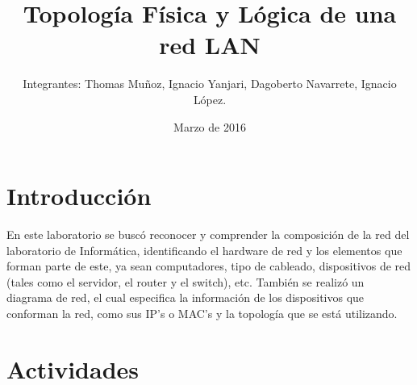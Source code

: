 \documentclass{udpreport}
\title{Topología Física y Lógica de una red LAN}
\author{Integrantes: Thomas Muñoz, Ignacio Yanjari, Dagoberto Navarrete, Ignacio López.}
\date{Marzo de 2016}
\begin{document}
\maketitle
\tableofcontents
\chapter{Introducción}
	        En este laboratorio se buscó reconocer y comprender la composición de la red del laboratorio de Informática,
	        identificando el hardware de red y los elementos que forman parte de este, ya sean computadores, tipo de cableado, 
	        dispositivos de red (tales como el servidor, el router y el switch), etc. También se realizó un diagrama de red, el 
	        cual especifica la información de los dispositivos que conforman la red, como sus IP's o MAC's y la topología que se 
	        está utilizando.
\chapter{Actividades}
\end{document}
